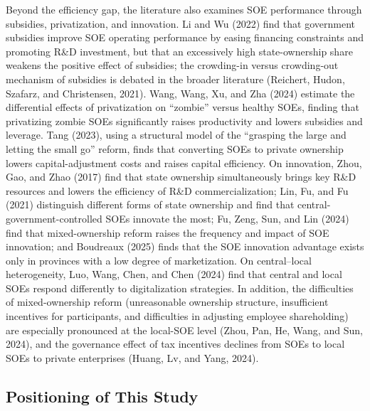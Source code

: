 \documentclass[11pt,a4paper]{article}
\begin{document}
Beyond the efficiency gap, the literature also examines SOE performance through subsidies, privatization, and innovation. Li and Wu (2022) find that government subsidies improve SOE operating performance by easing financing constraints and promoting R\&D investment, but that an excessively high state-ownership share weakens the positive effect of subsidies; the crowding-in versus crowding-out mechanism of subsidies is debated in the broader literature (Reichert, Hudon, Szafarz, and Christensen, 2021). Wang, Wang, Xu, and Zha (2024) estimate the differential effects of privatization on ``zombie'' versus healthy SOEs, finding that privatizing zombie SOEs significantly raises productivity and lowers subsidies and leverage. Tang (2023), using a structural model of the ``grasping the large and letting the small go'' reform, finds that converting SOEs to private ownership lowers capital-adjustment costs and raises capital efficiency. On innovation, Zhou, Gao, and Zhao (2017) find that state ownership simultaneously brings key R\&D resources and lowers the efficiency of R\&D commercialization; Lin, Fu, and Fu (2021) distinguish different forms of state ownership and find that central-government-controlled SOEs innovate the most; Fu, Zeng, Sun, and Lin (2024) find that mixed-ownership reform raises the frequency and impact of SOE innovation; and Boudreaux (2025) finds that the SOE innovation advantage exists only in provinces with a low degree of marketization. On central--local heterogeneity, Luo, Wang, Chen, and Chen (2024) find that central and local SOEs respond differently to digitalization strategies. In addition, the difficulties of mixed-ownership reform (unreasonable ownership structure, insufficient incentives for participants, and difficulties in adjusting employee shareholding) are especially pronounced at the local-SOE level (Zhou, Pan, He, Wang, and Sun, 2024), and the governance effect of tax incentives declines from SOEs to local SOEs to private enterprises (Huang, Lv, and Yang, 2024).

\subsection{Positioning of This Study}
\end{document}
